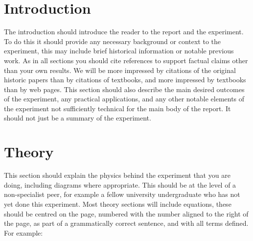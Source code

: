 \documentclass[11pt]{article} %
\begin{document}
\newpage %

\section{Introduction} 
\label{intro}

The introduction should introduce the reader to the report and the experiment. To do this it should provide any necessary background or context to the experiment, this may include brief historical information or notable previous work. As in all sections you should cite references to support factual claims other than your own results. We will be more impressed by citations of the original historic papers than by citations of textbooks, and more impressed by textbooks than by web pages. This section should also describe the main desired outcomes of the experiment, any practical applications, and any other notable elements of the experiment not sufficiently technical for the main body of the report. It should not just be a summary of the experiment.\\

\section{Theory}
This section should explain the physics behind the experiment that you are doing, including diagrams where appropriate. This should be at the level of a non-specialist peer, for example a fellow university undergraduate who has not yet done this experiment. Most theory sections will include equations, these should be centred on the page, numbered with the number aligned to the right of the page, as part of a grammatically correct sentence, and with all terms defined. For example:\\
\end{document}
